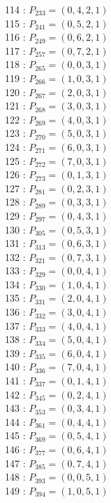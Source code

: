 \documentclass{article}
\begin{document}
{\begin{multicols}{3}
114 : $P_{233}=( 0, 4, 2, 1 )$\\
115 : $P_{241}=( 0, 5, 2, 1 )$\\
116 : $P_{249}=( 0, 6, 2, 1 )$\\
117 : $P_{257}=( 0, 7, 2, 1 )$\\
118 : $P_{265}=( 0, 0, 3, 1 )$\\
119 : $P_{266}=( 1, 0, 3, 1 )$\\
120 : $P_{267}=( 2, 0, 3, 1 )$\\
121 : $P_{268}=( 3, 0, 3, 1 )$\\
122 : $P_{269}=( 4, 0, 3, 1 )$\\
123 : $P_{270}=( 5, 0, 3, 1 )$\\
124 : $P_{271}=( 6, 0, 3, 1 )$\\
125 : $P_{272}=( 7, 0, 3, 1 )$\\
126 : $P_{273}=( 0, 1, 3, 1 )$\\
127 : $P_{281}=( 0, 2, 3, 1 )$\\
128 : $P_{289}=( 0, 3, 3, 1 )$\\
129 : $P_{297}=( 0, 4, 3, 1 )$\\
130 : $P_{305}=( 0, 5, 3, 1 )$\\
131 : $P_{313}=( 0, 6, 3, 1 )$\\
132 : $P_{321}=( 0, 7, 3, 1 )$\\
133 : $P_{329}=( 0, 0, 4, 1 )$\\
134 : $P_{330}=( 1, 0, 4, 1 )$\\
135 : $P_{331}=( 2, 0, 4, 1 )$\\
136 : $P_{332}=( 3, 0, 4, 1 )$\\
137 : $P_{333}=( 4, 0, 4, 1 )$\\
138 : $P_{334}=( 5, 0, 4, 1 )$\\
139 : $P_{335}=( 6, 0, 4, 1 )$\\
140 : $P_{336}=( 7, 0, 4, 1 )$\\
141 : $P_{337}=( 0, 1, 4, 1 )$\\
142 : $P_{345}=( 0, 2, 4, 1 )$\\
143 : $P_{353}=( 0, 3, 4, 1 )$\\
144 : $P_{361}=( 0, 4, 4, 1 )$\\
145 : $P_{369}=( 0, 5, 4, 1 )$\\
146 : $P_{377}=( 0, 6, 4, 1 )$\\
147 : $P_{385}=( 0, 7, 4, 1 )$\\
148 : $P_{393}=( 0, 0, 5, 1 )$\\
149 : $P_{394}=( 1, 0, 5, 1 )$\\

\end{multicols}}
\end{document}
